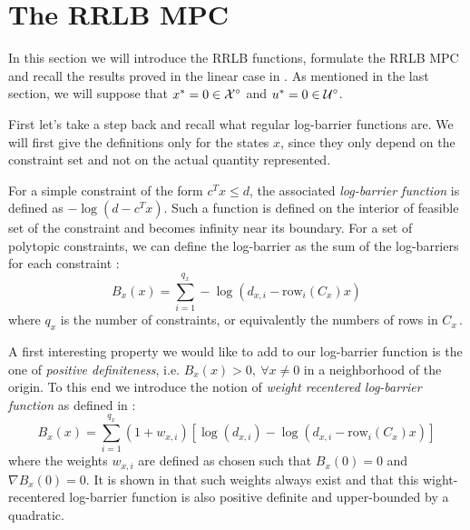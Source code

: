 \documentclass[12pt]{article}
\begin{document}
\section{The RRLB MPC}\label{sec:RRLB-MPC}

In this section we will introduce the RRLB functions, formulate the RRLB MPC and recall the results proved in the linear case in \cite{RRLB-linear-MPC}.
As mentioned in the last section, we will suppose that $x^*=0\in\cal{X}^\circ$ and $u^*=0\in\cal{U}^\circ$.

\vspace{12pt}

First let's take a step back and recall what regular log-barrier functions are.
We will first give the definitions only for the states $x$, since they only depend on the constraint set and not on the actual quantity represented.

For a simple constraint of the form $c^Tx\leq d$, the associated \textit{log-barrier function} is defined as $-\log(d-c^Tx)$.
Such a function is defined on the interior of feasible set of the constraint and becomes infinity near its boundary.
For a set of polytopic constraints, we can define the log-barrier as the sum of the log-barriers for each constraint :
$$B_x(x)=\sum_{i=1}^{q_x}-\log(d_{x,i}-\mathrm{row}_i(C_x)x)$$
where $q_x$ is the number of constraints, or equivalently the numbers of rows in $C_x$\,.

A first interesting property we would like to add to our log-barrier function is the one of \textit{positive definiteness}, i.e. $B_x(x)>0,~\forall x\neq 0$ in a neighborhood of the origin.
To this end we introduce the notion of \textit{weight recentered log-barrier function} as defined in \cite{RLB} :
$$B_x(x)=\sum_{i=1}^{q_x}(1+w_{x,i})\left[\log(d_{x,i})-\log(d_{x,i}-\mathrm{row}_i(C_x)x)\right]$$
where the weights $w_{x,i}$ are defined as chosen such that $B_x(0)=0$ and $\nabla B_x(0)=0$.
It is shown in \cite{RLB} that such weights always exist and that this wight-recentered log-barrier function is also positive definite and upper-bounded by a quadratic.
\end{document}
